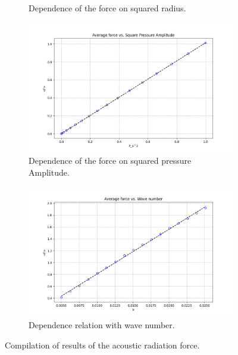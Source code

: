 \begin{figure}
\begin{subfigure}{0.4\textwidth}
    \caption{Dependence of the force on squared radius.}
    \label{fig:position}
    \end{subfigure}
    \begin{subfigure}{0.35\textwidth}
    \centering
    \includegraphics[width=\textwidth]{images/Results/Amplitude2D.png}
    \caption{Dependence of the force on squared pressure Amplitude.}
    \label{fig:radius}
    \end{subfigure}
    \begin{subfigure}{0.35\textwidth}
    \centering
    \includegraphics[width=\textwidth]{images/Results/WaveNumber2D.png}
    \caption{Dependence relation with wave number.}
    \label{fig:radius}
    \end{subfigure}
    \caption{Compilation of results of the acoustic radiation force.}
    \label{fig:ARF_results}
\end{figure}


